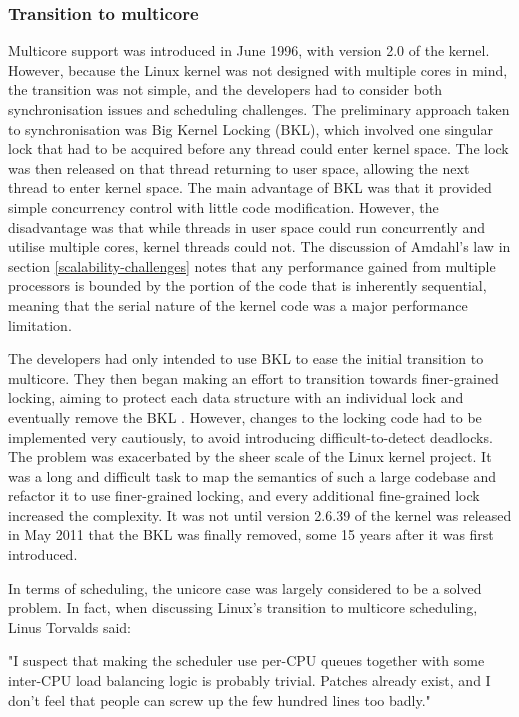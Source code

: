 \documentclass[bsc,frontabs,singlespacing,parskip,deptreport]{infthesis}     %
\begin{document}
\subsubsection{Transition to multicore} \label{transition-to-multicore}
Multicore support was introduced in June 1996, with version 2.0 of the kernel. However, because the Linux kernel was not designed with multiple cores in mind, the transition was not simple, and the developers had to consider both synchronisation issues and scheduling challenges. The preliminary approach taken to synchronisation was Big Kernel Locking (BKL), which involved one singular lock that had to be acquired before any thread could enter kernel space. The lock was then released on that thread returning to user space, allowing the next thread to enter kernel space. The main advantage of BKL was that it provided simple concurrency control with little code modification. However, the disadvantage was that while threads in user space could run concurrently and utilise multiple cores, kernel threads could not. The discussion of Amdahl's law in section \ref{scalability-challenges} notes that any performance gained from multiple processors is bounded by the portion of the code that is inherently sequential, meaning that the serial nature of the kernel code was a major performance limitation.

The developers had only intended to use BKL to ease the initial transition to multicore. They then began making an effort to transition towards finer-grained locking, aiming to protect each data structure with an individual lock and eventually remove the BKL \cite{locking-smp-kernels}. However, changes to the locking code had to be implemented very cautiously, to avoid introducing difficult-to-detect deadlocks. The problem was exacerbated by the sheer scale of the Linux kernel project.  It was a long and difficult task to map the semantics of such a large codebase and refactor it to use finer-grained locking, and every additional fine-grained lock increased the complexity. It was not until version 2.6.39 of the kernel was released in May 2011 that the BKL was finally removed, some 15 years after it was first introduced. 

In terms of scheduling, the unicore case was largely considered to be a solved problem. In fact, when discussing Linux's transition to multicore scheduling, Linus Torvalds said:

\begin{displayquote}
"I suspect that making the
scheduler use per-CPU queues together with some inter-CPU load balancing
logic is probably trivial. Patches already exist, and I don't feel that
people can screw up the few hundred lines too badly." \cite{lwn-sched-easy}
\end{displayquote} 
\end{document}
